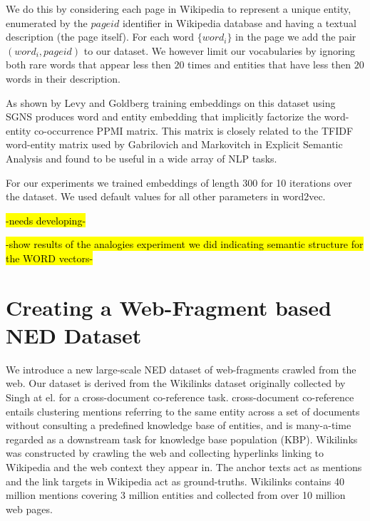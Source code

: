 \documentclass[11pt]{article}
\begin{document}
	We do this by considering each page in Wikipedia to represent a unique entity, enumerated by the $pageid$ identifier in Wikipedia database and having a textual description (the page itself). For each word $\{word_i\}$ in the page we add the pair $(word_i,pageid)$ to our dataset. We however limit our vocabularies by ignoring both rare words that appear less then $20$ times and entities that have less then $20$ words in their description.
		
	As shown by Levy and Goldberg \cite{levy2014neural} training embeddings on this dataset using SGNS produces word and entity embedding that implicitly factorize the word-entity co-occurrence PPMI matrix. This matrix is closely related to the TFIDF word-entity matrix used by Gabrilovich and Markovitch \cite{gabrilovich2007computing} in Explicit Semantic Analysis and found to be useful in a wide array of NLP tasks. 
	
	For our experiments we trained embeddings of length 300 for 10 iterations over the dataset. We used default values for all other parameters in word2vec.
	
	\hl{-needs developing-}
	
	\hl{-show results of the analogies experiment we did indicating semantic structure for the WORD vectors-}
	
	\section{\label{sec:w}Creating a Web-Fragment based NED Dataset}
	We introduce a new large-scale NED dataset of web-fragments crawled from the web. Our dataset is derived from the Wikilinks dataset originally collected by Singh at el. \cite{singh12:wiki-links} for a cross-document co-reference task. cross-document co-reference entails clustering mentions referring to the same entity across a set of documents without consulting a predefined knowledge base of entities, and is many-a-time regarded as a downstream task for knowledge base population (KBP). Wikilinks was constructed by crawling the web and collecting hyperlinks linking to Wikipedia and the web context they appear in. The anchor texts act as mentions and the link targets in Wikipedia act as ground-truths. Wikilinks contains 40 million mentions covering 3 million entities and collected from over 10 million web pages.
	
\end{document}

